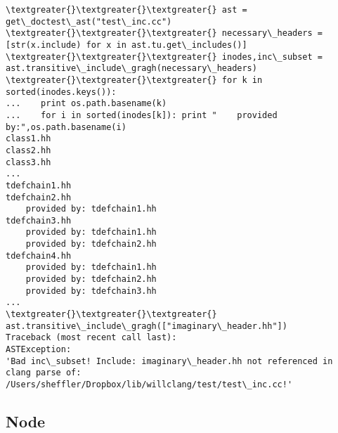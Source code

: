 \documentclass[letterpaper,10pt,english]{sphinxmanual}
\begin{document}
\begin{fulllineitems}
\begin{fulllineitems}
\begin{Verbatim}[commandchars=\\\{\}]
\textgreater{}\textgreater{}\textgreater{} ast = get\_doctest\_ast("test\_inc.cc")
\textgreater{}\textgreater{}\textgreater{} necessary\_headers = [str(x.include) for x in ast.tu.get\_includes()]
\textgreater{}\textgreater{}\textgreater{} inodes,inc\_subset = ast.transitive\_include\_gragh(necessary\_headers)
\textgreater{}\textgreater{}\textgreater{} for k in sorted(inodes.keys()):          
...    print os.path.basename(k)
...    for i in sorted(inodes[k]): print "    provided by:",os.path.basename(i)
class1.hh
class2.hh
class3.hh
...
tdefchain1.hh
tdefchain2.hh
    provided by: tdefchain1.hh
tdefchain3.hh
    provided by: tdefchain1.hh
    provided by: tdefchain2.hh
tdefchain4.hh
    provided by: tdefchain1.hh
    provided by: tdefchain2.hh
    provided by: tdefchain3.hh
...
\textgreater{}\textgreater{}\textgreater{} ast.transitive\_include\_gragh(["imaginary\_header.hh"])    
Traceback (most recent call last):
ASTException: 
'Bad inc\_subset! Include: imaginary\_header.hh not referenced in clang parse of: /Users/sheffler/Dropbox/lib/willclang/test/test\_inc.cc!'
\end{Verbatim}

\end{fulllineitems}


\end{fulllineitems}



\subsection{Node}
\label{code:node}
\end{document}

